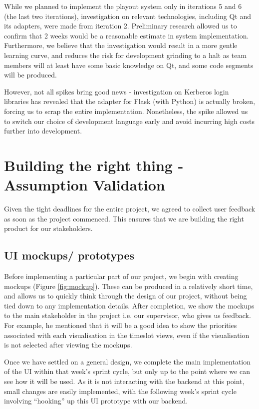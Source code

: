 \documentclass[a4paper]{article}
\begin{document}
While we planned to implement the playout system only in iterations 5 and 6 (the last two iterations), investigation on relevant technologies, including Qt and its adapters, were made from iteration 2. Preliminary research allowed us to confirm that 2 weeks would be a reasonable estimate in system implementation. Furthermore, we believe that the investigation would result in a more gentle learning curve, and reduces the risk for development grinding to a halt as team members will at least have some basic knowledge on Qt, and some code segments will be produced.

However, not all spikes bring good news - investigation on Kerberos login libraries has revealed that the adapter for Flask (with Python) is actually broken, forcing us to scrap the entire implementation. Nonetheless, the spike allowed us to switch our choice of development language early and avoid incurring high costs further into development.

\section{Building the right thing - Assumption Validation} \label{sec:validation}

Given the tight deadlines for the entire project, we agreed to collect
user feedback as soon as the project commenced. This ensures that we are building the right product for our stakeholders.

\subsection{UI mockups/ prototypes} \label{sec:uimockup}

Before implementing a particular part of our project, we begin with creating mockups (Figure \ref{fig:mockup}). These can be produced in a relatively short time, and allows us to quickly think through the design of our project, without being tied down to any implementation details. After completion, we show the mockups to the main stakeholder in the project i.e. our supervisor, who gives us feedback. For example, he mentioned that it will be a good idea to show the priorities associated with each visualisation in the timeslot views, even if the visualisation is not selected after viewing the mockups.

Once we have settled on a general design, we complete the main implementation of the UI within that week's sprint cycle, but only up to the point where we can see how it will be used. As it is not interacting with the backend at this point, small changes are easily implemented, with the following week's sprint cycle involving ``hooking'' up this UI prototype with our backend.
\end{document}
